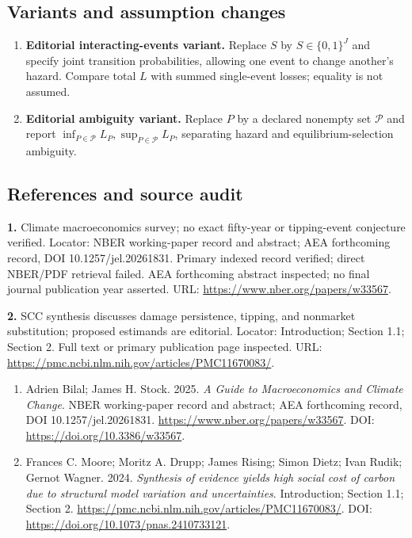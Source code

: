\documentclass[11pt,a4paper]{article}
\begin{document}
\subsection*{Variants and assumption changes}
\begin{enumerate}
\item \textbf{Editorial interacting-events variant.} Replace \(S\) by \(S\in\{0,1\}^J\) and specify joint transition probabilities, allowing one event to change another's hazard. Compare total \(L\) with summed single-event losses; equality is not assumed.
\item \textbf{Editorial ambiguity variant.} Replace \(P\) by a declared nonempty set \(\mathcal P\) and report \(\inf_{P\in\mathcal P}L_P,\sup_{P\in\mathcal P}L_P\), separating hazard and equilibrium-selection ambiguity.
\end{enumerate}
\subsection*{References and source audit}
\textbf{1.} Climate macroeconomics survey; no exact fifty-year or tipping-event conjecture verified. Locator: NBER working-paper record and abstract; AEA forthcoming record, DOI 10.1257/jel.20261831. Primary indexed record verified; direct NBER/PDF retrieval failed. AEA forthcoming abstract inspected; no final journal publication year asserted. URL: \url{https://www.nber.org/papers/w33567}.

\textbf{2.} SCC synthesis discusses damage persistence, tipping, and nonmarket substitution; proposed estimands are editorial. Locator: Introduction; Section 1.1; Section 2. Full text or primary publication page inspected. URL: \url{https://pmc.ncbi.nlm.nih.gov/articles/PMC11670083/}.
\begin{enumerate}\raggedright
\item\hypertarget{definitions:source:30007713:1}{} Adrien Bilal; James H. Stock. 2025. \emph{A Guide to Macroeconomics and Climate Change}. NBER working-paper record and abstract; AEA forthcoming record, DOI 10.1257/jel.20261831.
\url{https://www.nber.org/papers/w33567}.
DOI: \url{https://doi.org/10.3386/w33567}.
\item\hypertarget{definitions:source:30007713:2}{} Frances C. Moore; Moritz A. Drupp; James Rising; Simon Dietz; Ivan Rudik; Gernot Wagner. 2024. \emph{Synthesis of evidence yields high social cost of carbon due to structural model variation and uncertainties}. Introduction; Section 1.1; Section 2.
\url{https://pmc.ncbi.nlm.nih.gov/articles/PMC11670083/}.
DOI: \url{https://doi.org/10.1073/pnas.2410733121}.
\end{enumerate}
\end{document}
